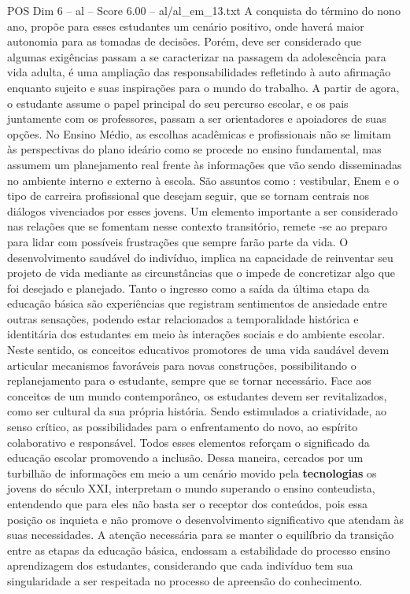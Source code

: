 \begin{textsample}{POS Dim 6 – al – Score 6.00 – al/al\_em\_13.txt}
A conquista do término do nono ano, propõe para esses estudantes um cenário positivo, onde haverá maior autonomia para as tomadas de decisões.
Porém, deve ser considerado que algumas exigências passam a se caracterizar na passagem da adolescência para vida adulta, é uma ampliação das responsabilidades refletindo à auto afirmação enquanto sujeito e suas inspirações para o mundo do trabalho.
A partir de agora, o estudante assume o papel principal do seu percurso escolar, e os pais juntamente com os professores, passam a ser orientadores e apoiadores de suas opções.
No Ensino Médio, as escolhas acadêmicas e profissionais não se limitam às perspectivas do plano ideário como se procede no ensino fundamental, mas assumem um planejamento real frente às informações que vão sendo disseminadas no ambiente interno e externo à escola.
São assuntos como : vestibular, Enem e o tipo de carreira profissional que desejam seguir, que se tornam centrais nos diálogos vivenciados por esses jovens.
Um elemento importante a ser considerado nas relações que se fomentam nesse contexto transitório, remete -se ao preparo para lidar com possíveis frustrações que sempre farão parte da vida.
O desenvolvimento saudável do indivíduo, implica na capacidade de reinventar seu projeto de vida mediante as circunstâncias que o impede de concretizar algo que foi desejado e planejado.
Tanto o ingresso como a saída da última etapa da educação básica são experiências que registram sentimentos de ansiedade entre outras sensações, podendo estar relacionados a temporalidade histórica e identitária dos estudantes em meio às interações sociais e do ambiente escolar.
Neste sentido, os conceitos educativos promotores de uma vida saudável devem articular mecanismos favoráveis para novas construções, possibilitando o replanejamento para o estudante, sempre que se tornar necessário.
Face aos conceitos de um mundo contemporâneo, os estudantes devem ser revitalizados, como ser cultural da sua própria história.
Sendo estimulados a criatividade, ao senso crítico, as possibilidades para o enfrentamento do novo, ao espírito colaborativo e responsável.
Todos esses elementos reforçam o significado da educação escolar promovendo a inclusão.
Dessa maneira, cercados por um turbilhão de informações em meio a um cenário movido pela \textbf{tecnologias} os jovens do século XXI, interpretam o mundo superando o ensino conteudista, entendendo que para eles não basta ser o receptor dos conteúdos, pois essa posição os inquieta e não promove o desenvolvimento significativo que atendam às suas necessidades.
A atenção necessária para se manter o equilíbrio da transição entre as etapas da educação básica, endossam a estabilidade do processo ensino aprendizagem dos estudantes, considerando que cada indivíduo tem sua singularidade a ser respeitada no processo de apreensão do conhecimento.

\end{textsample}
